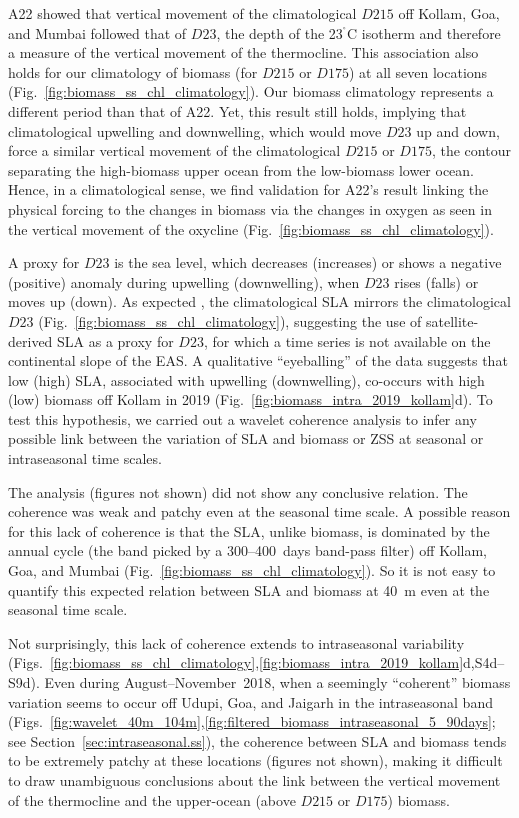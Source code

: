 \documentclass[authoryear,review,11pt]{elsarticle}
\newcommand{\cdigri}{{\ensuremath{^{^\circ}}\mathrm{C}}}
\begin{document}
A22 showed that vertical movement of the climatological $D215$ off Kollam, Goa, and Mumbai followed that of $D23$, the depth of the 23$\cdigri$ isotherm and therefore a measure of the vertical movement of the thermocline.  This association also holds for our climatology of biomass (for $D215$ or $D175$) at all seven locations (Fig.~\ref{fig:biomass_ss_chl_climatology}).  Our biomass climatology represents a different period than that of A22. Yet, this result still holds, implying that climatological upwelling and downwelling, which would move $D23$ up and down, force a similar vertical movement of the climatological $D215$ or $D175$, the contour separating the high-biomass upper ocean from the low-biomass lower ocean.  Hence, in a climatological sense, we find validation for A22's result linking the physical forcing to the changes in biomass via the changes in oxygen as seen in the vertical movement of the oxycline (Fig.~\ref{fig:biomass_ss_chl_climatology}).  

A proxy for $D23$ is the sea level, which decreases (increases) or shows a negative (positive) anomaly during upwelling (downwelling), when $D23$ rises (falls) or moves up (down). As expected \citep[see, for example,][]{shankar2000seasonal}, the climatological SLA mirrors the climatological $D23$ (Fig.~\ref{fig:biomass_ss_chl_climatology}), suggesting the use of satellite-derived SLA as a proxy for $D23$, for which a time series is not available on the continental slope of the EAS. A qualitative ``eyeballing'' of the data suggests that low (high) SLA, associated with upwelling (downwelling), co-occurs with high (low) biomass off Kollam in 2019 (Fig.~\ref{fig:biomass_intra_2019_kollam}d).  To test this hypothesis, we carried out a wavelet coherence analysis to infer any possible link between the variation of SLA and biomass or ZSS at seasonal or intraseasonal time scales.  

The analysis (figures not shown) did not show any conclusive relation. The coherence was weak and patchy even at the seasonal time scale. A possible reason for this lack of coherence is that the SLA, unlike biomass, is dominated by the annual cycle (the band picked by a 300--400~days band-pass filter) off Kollam, Goa, and Mumbai (Fig.~\ref{fig:biomass_ss_chl_climatology}). So it is not easy to quantify this expected relation between SLA and biomass at 40~m even at the seasonal time scale.

Not surprisingly, this lack of coherence extends to intraseasonal variability (Figs.~\ref{fig:biomass_ss_chl_climatology},\ref{fig:biomass_intra_2019_kollam}d,S4d--S9d).  Even during August--November~2018, when a seemingly ``coherent'' biomass variation seems to occur off Udupi, Goa, and Jaigarh in the intraseasonal band (Figs.~\ref{fig:wavelet_40m_104m},\ref{fig:filtered_biomass_intraseasonal_5_90days}; see Section~\ref{sec:intraseasonal.ss}), the coherence between SLA and biomass tends to be extremely patchy at these locations (figures not shown), making it difficult to draw unambiguous conclusions about the link between the vertical movement of the thermocline and the upper-ocean (above $D215$ or $D175$) biomass.
\end{document}
